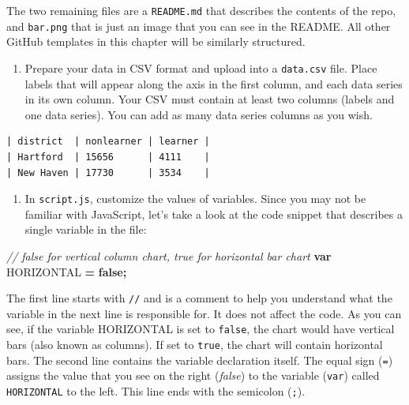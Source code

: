 \documentclass[
  english,
]{book}
\newenvironment{Shaded}{\begin{snugshade}}{\end{snugshade}}
\newcommand{\CommentTok}[1]{\textcolor[rgb]{0.56,0.35,0.01}{\textit{#1}}}
\newcommand{\KeywordTok}[1]{\textcolor[rgb]{0.13,0.29,0.53}{\textbf{#1}}}
\newcommand{\NormalTok}[1]{#1}
\newcommand{\OperatorTok}[1]{\textcolor[rgb]{0.81,0.36,0.00}{\textbf{#1}}}
\providecommand{\tightlist}{%
  \setlength{\itemsep}{0pt}\setlength{\parskip}{0pt}}
\begin{document}
The two remaining files are a \texttt{README.md} that describes the contents of the repo, and \texttt{bar.png} that is just an image that you can see in the README. All other GitHub templates in this chapter will be similarly structured.

\begin{enumerate}
\def\labelenumi{\arabic{enumi}.}
\setcounter{enumi}{1}
\tightlist
\item
  Prepare your data in CSV format and upload into a \texttt{data.csv} file. Place labels that will appear along the axis in the first column, and each data series in its own column. Your CSV must contain at least two columns (labels and one data series). You can add as many data series columns as you wish.
\end{enumerate}

\begin{verbatim}
| district  | nonlearner | learner |
| Hartford  | 15656      | 4111    |
| New Haven | 17730      | 3534    |
\end{verbatim}

\begin{enumerate}
\def\labelenumi{\arabic{enumi}.}
\setcounter{enumi}{2}
\tightlist
\item
  In \texttt{script.js}, customize the values of variables. Since you may not be familiar with JavaScript, let's take a look at the code snippet that describes a single variable in the file:
\end{enumerate}

\begin{Shaded}
\begin{Highlighting}[]
\CommentTok{// \textasciigrave{}false\textasciigrave{} for vertical column chart, \textasciigrave{}true\textasciigrave{} for horizontal bar chart}
\KeywordTok{var}\NormalTok{ HORIZONTAL }\OperatorTok{=} \KeywordTok{false}\OperatorTok{;}
\end{Highlighting}
\end{Shaded}

The first line starts with \texttt{//} and is a comment to help you understand what the variable in the next line is responsible for. It does not affect the code. As you can see, if the variable HORIZONTAL is set to \texttt{false}, the chart would have vertical bars (also known as columns). If set to \texttt{true}, the chart will contain horizontal bars. The second line contains the variable declaration itself. The equal sign (\texttt{=}) assigns the value that you see on the right (\emph{false}) to the variable (\texttt{var}) called \texttt{HORIZONTAL} to the left. This line ends with the semicolon (\texttt{;}).
\end{document}
